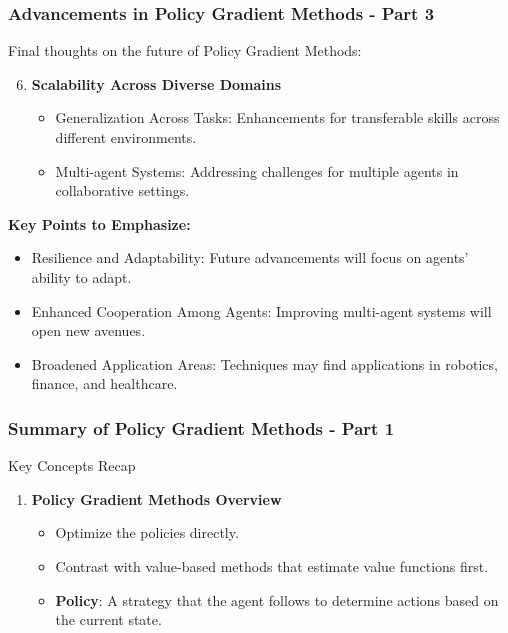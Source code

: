 \documentclass[aspectratio=169]{beamer}
\begin{document}
\begin{frame}[fragile]
    \frametitle{Advancements in Policy Gradient Methods - Part 3}
    Final thoughts on the future of Policy Gradient Methods:
    
    \begin{enumerate}
        \setcounter{enumi}{5} %
        \item \textbf{Scalability Across Diverse Domains}
        \begin{itemize}
            \item Generalization Across Tasks: Enhancements for transferable skills across different environments.
            \item Multi-agent Systems: Addressing challenges for multiple agents in collaborative settings.
        \end{itemize}
    \end{enumerate}
    
    \textbf{Key Points to Emphasize:}
    \begin{itemize}
        \item Resilience and Adaptability: Future advancements will focus on agents' ability to adapt.
        \item Enhanced Cooperation Among Agents: Improving multi-agent systems will open new avenues.
        \item Broadened Application Areas: Techniques may find applications in robotics, finance, and healthcare.
    \end{itemize}
\end{frame}

\begin{frame}[fragile]
    \frametitle{Summary of Policy Gradient Methods - Part 1}
    \begin{block}{Key Concepts Recap}
        \begin{enumerate}
            \item \textbf{Policy Gradient Methods Overview}
                \begin{itemize}
                    \item Optimize the policies directly.
                    \item Contrast with value-based methods that estimate value functions first.
                    \item \textbf{Policy}: A strategy that the agent follows to determine actions based on the current state.
                \end{itemize}
        \end{enumerate}
    \end{block}
\end{frame}
\end{document}
